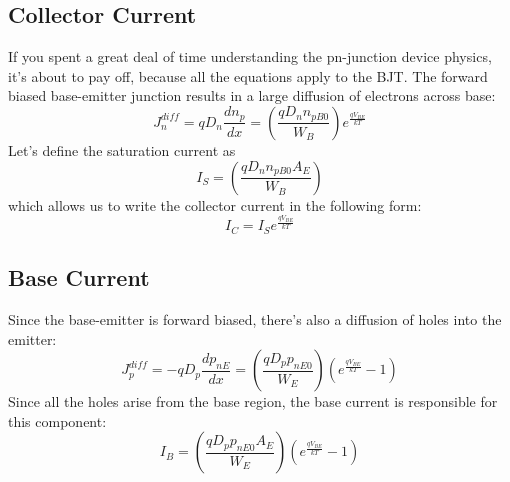 \subsection{Collector Current}
If you spent a great deal of time understanding the pn-junction device physics, it's about to pay off, because all the equations apply to the BJT.  The forward biased base-emitter junction results in a large diffusion of electrons across base:
\begin{equation}
	J_n^{diff} = q{D_n}\frac{{d{n_p}}}{{dx}} = \left( {\frac{{q{D_n}{n_{pB0}}}}{{{W_B}}}} \right)	{e^{\frac{{q{V_{BE}}}}{{kT}}}}
\end{equation}
Let's define the saturation current as
\begin{equation}
	{I_S} = \left( {\frac{{q{D_n}{n_{pB0}}{A_E}}}{{{W_B}}}} \right)
\end{equation}
which allows us to write the collector current in the following form:
\begin{equation}
	{I_C} = {I_S}{e^{\frac{{q{V_{BE}}}}{{kT}}}}
\end{equation}
\subsection{Base Current}
Since the base-emitter is forward biased, there's also a diffusion of holes into the emitter:
\begin{equation}
	J_p^{diff} =  - q{D_p}\frac{{d{p_{nE}}}}{{dx}} = \left( {\frac{{q{D_p}{p_{nE0}}}}{{{W_E}}}} \right)\left( 	{{e^{\frac{{q{V_{BE}}}}{{kT}}}} - 1} \right)
\end{equation}
Since all the holes arise from the base region, the base current is responsible for this component:
\begin{equation}
	{I_B} = \left( {\frac{{q{D_p}{p_{nE0}}{A_E}}}{{{W_E}}}} \right)\left( {{e^{\frac{{q{V_{BE}}}}{{kT}}}} - 1} \right)
\end{equation}
